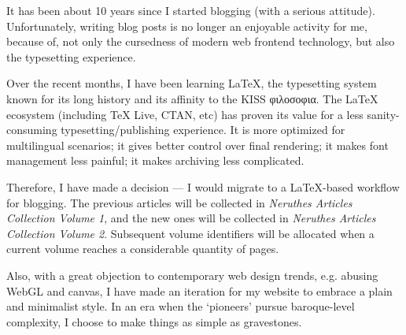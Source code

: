
\begin{multicols*}{2}
	It has been about 10 years since I started blogging (with a serious attitude).
	Unfortunately, writing blog posts is no longer an enjoyable activity for me,
	because of, not only the cursedness of modern web frontend technology,
	but also the typesetting experience.

	Over the recent months, I have been learning LaTeX,
	the typesetting system known for its long history and its affinity to the KISS φιλοσοφια.
	The LaTeX ecosystem (including TeX Live, CTAN, etc)
	has proven its value for a less sanity-consuming typesetting/publishing experience.
	It is more optimized for multilingual scenarios; it gives better control over final rendering;
	it makes font management less painful; it makes archiving less complicated.

	Therefore, I have made a decision ---
	I would migrate to a LaTeX-based workflow for blogging.
	The previous articles will be collected in \textit{Neruthes Articles Collection Volume 1},
	and the new ones will be collected in \textit{Neruthes Articles Collection Volume 2}.
	Subsequent volume identifiers will be allocated when a current volume reaches a considerable quantity of pages.

	Also, with a great objection to contemporary web design trends,
	e.g. abusing WebGL and canvas,
	I have made an iteration for my website to embrace a plain and minimalist style.
	In an era when the `pioneers' pursue baroque-level complexity,
	I choose to make things as simple as gravestones.
\end{multicols*}
